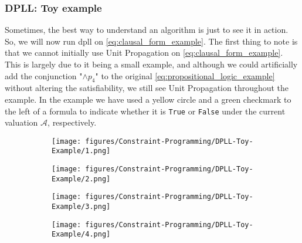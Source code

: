 \subsubsection{DPLL: Toy example}
Sometimes, the best way to understand an algorithm is just to see it in action. So, we will now run \acrshort{dpll} on \autoref{eq:clausal_form_example}. The first thing to note is that we cannot initially use Unit Propagation on \autoref{eq:clausal_form_example}. This is largely due to it being a small example, and although we could artificially add the conjunction "\(\wedge p_4\)" to the original \autoref{eq:propositional_logic_example} without altering the satisfiability, we still see Unit Propagation throughout the example. In the example we have used a yellow circle and a green checkmark to the left of a formula to indicate whether it is \texttt{True} or \texttt{False} under the current valuation \(\mathcal{A}\), respectively.
\begin{figure}[H]
    \centering
    \begin{subfigure}[t]{0.45\textwidth}
        \centering
        \texttt{[image: figures/Constraint-Programming/DPLL-Toy-Example/1.png]}
    \end{subfigure}
    \begin{subfigure}[t]{0.45\textwidth}
        \centering
        \texttt{[image: figures/Constraint-Programming/DPLL-Toy-Example/2.png]}
    \end{subfigure}
\end{figure}

\begin{figure}[H]
    \centering
    \begin{subfigure}[t]{0.45\textwidth}
        \centering
        \texttt{[image: figures/Constraint-Programming/DPLL-Toy-Example/3.png]}
    \end{subfigure}
    \begin{subfigure}[t]{0.45\textwidth}
        \centering
        \texttt{[image: figures/Constraint-Programming/DPLL-Toy-Example/4.png]}
    \end{subfigure}
\end{figure}

